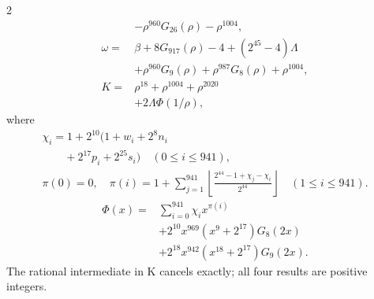 \documentclass[10pt]{article}
\newcommand{\fl}[1]{\left\lfloor#1\right\rfloor}
\begin{document}
\begin{multicols}{2}
\begin{align*}
&-\rho^{960}G_{26}(\rho)-\rho^{1004},\\
\omega={}&\beta+8G_{917}(\rho)-4+(2^{45}-4)\Lambda\\
&+\rho^{960}G_9(\rho)+\rho^{987}G_8(\rho)
  +\rho^{1004},\\
K={}&\rho^{18}+\rho^{1004}+\rho^{2020}\\
&+2\Lambda\Phi(1/\rho),
\end{align*}
where
\[
\begin{gathered}
\chi_i=1+2^{10}(1+w_i+2^8n_i\\
\qquad+2^{17}p_i+2^{25}s_i)\quad(0\le i\le941),\\
\pi(0)=0,\quad\pi(i)=1+\sum_{j=1}^{941}
\fl{\frac{2^{44}-1+\chi_j-\chi_i}{2^{44}}}\quad(1\le i\le941).
\end{gathered}
\]
\[
\begin{split}
\Phi(x)={}&\sum_{i=0}^{941}\chi_i x^{\pi(i)}\\
&+2^{10}x^{969}(x^9+2^{17})G_8(2x)\\
&+2^{18}x^{942}(x^{18}+2^{17})G_9(2x).
\end{split}
\]
The rational intermediate in K cancels exactly; all four results are positive integers.


\end{multicols}
\end{document}

